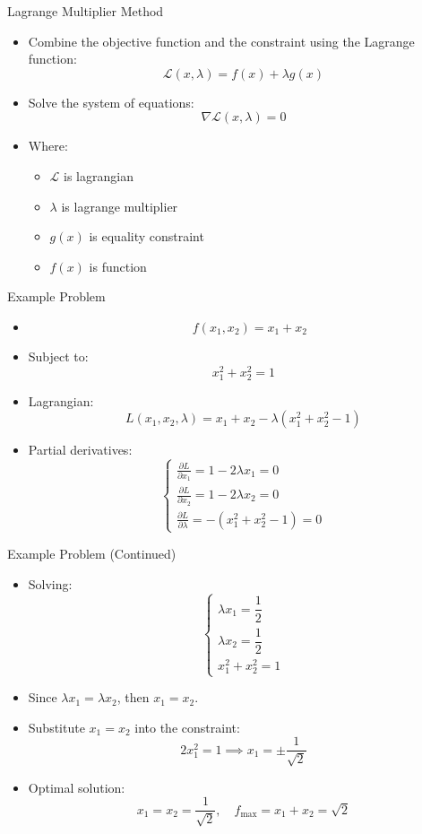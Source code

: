 \documentclass[serif, aspectratio=169]{beamer}
\begin{document}
\begin{frame}{Lagrange Multiplier Method}
    \begin{itemize}
        \item Combine the objective function and the constraint using the Lagrange function:
        $$\mathcal{L}(x, \lambda) = f(x) + \lambda g(x)$$
        \item Solve the system of equations:
        $$\nabla \mathcal{L}(x, \lambda) = 0$$
        \item Where:
        \begin{itemize}
            \item $\mathcal{L}$ is  lagrangian
            \item $\lambda$ is lagrange multiplier
            \item $g(x)$ is equality constraint
            \item $f(x)$ is function
        \end{itemize}
    \end{itemize}
\end{frame}

\begin{frame}{Example Problem}
\begin{itemize}
    \item {}
        \[
 \quad f(x_1, x_2) = x_1 + x_2
\]
    \item Subject to:
    \[
x_1^2 + x_2^2 = 1
\]
    \item Lagrangian:
    \[
L(x_1, x_2, \lambda) = x_1 + x_2 - \lambda (x_1^2 + x_2^2 - 1)
\]
    \item Partial derivatives:
    \[
\begin{cases}
\frac{\partial L}{\partial x_1} = 1 - 2\lambda x_1 = 0 \\
\frac{\partial L}{\partial x_2} = 1 - 2\lambda x_2 = 0 \\
\frac{\partial L}{\partial \lambda} = -(x_1^2 + x_2^2 - 1) = 0
\end{cases}
\]
\end{itemize}
\end{frame}

\begin{frame}{Example Problem (Continued)}
\begin{itemize}
    \item Solving:
\[
\begin{cases}
\lambda x_1 = \dfrac{1}{2} \\
\lambda x_2 = \dfrac{1}{2} \\
x_1^2 + x_2^2 = 1
\end{cases}
\]
    \item Since \(\lambda x_1 = \lambda x_2\), then \(x_1 = x_2\).
    \item Substitute \(x_1 = x_2\) into the constraint:
    \[
2x_1^2 = 1 \implies x_1 = \pm \dfrac{1}{\sqrt{2}}
\]
    \item Optimal solution:
\[
x_1 = x_2 = \dfrac{1}{\sqrt{2}}, \quad f_{\text{max}} = x_1 + x_2 = \sqrt{2}
\]
\end{itemize}

\end{frame}
\end{document}
